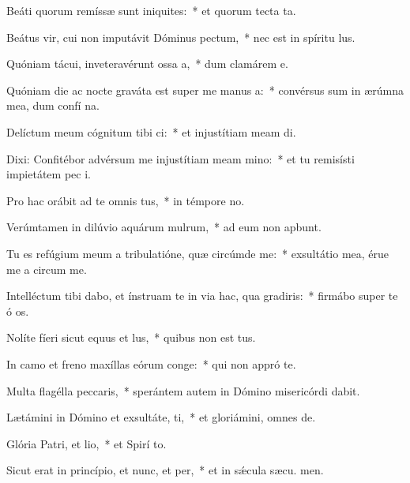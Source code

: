 \item Beáti quorum remíssæ sunt iniquites:~* et quorum tecta  ta.
\item Beátus vir, cui non imputávit Dóminus pectum,~* nec est in spíritu  lus.
\item Quóniam tácui, inveteravérunt ossa a,~* dum clamárem  e.
\item Quóniam die ac nocte graváta est super me manus a:~* convérsus sum in ærúmna mea, dum confí na.
\item Delíctum meum cógnitum tibi ci:~* et injustítiam meam  di.
\item Dixi: Confitébor advérsum me injustítiam meam mino:~* et tu remisísti impietátem pec i.
\item Pro hac orábit ad te omnis tus,~* in témpore no.
\item Verúmtamen in dilúvio aquárum mulrum,~* ad eum non apbunt.
\item Tu es refúgium meum a tribulatióne, quæ circúmde me:~* exsultátio mea, érue me a circum me.
\item Intelléctum tibi dabo, et ínstruam te in via hac, qua gradiris:~* firmábo super te ó os.
\item Nolíte fíeri sicut equus et lus,~* quibus non est tus.
\item In camo et freno maxíllas eórum conge:~* qui non appró  te.
\item Multa flagélla peccaris,~* sperántem autem in Dómino misericórdi dabit.
\item Lætámini in Dómino et exsultáte, ti,~* et gloriámini, omnes  de.
\item Glória Patri, et lio,~* et Spirí to.
\item Sicut erat in princípio, et nunc, et per,~* et in sǽcula sæcu. men.
